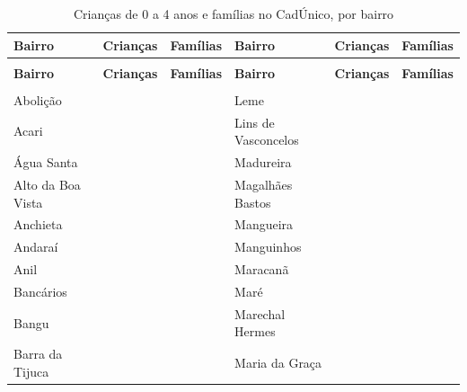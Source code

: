 \begin{apendicesenv}
{\renewcommand{\arraystretch}{1.0}
{\footnotesize\setlength{\tabcolsep}{3.5pt}
\begin{longtable}{@{}>{\raggedright\arraybackslash}p{2.95cm}>{\raggedleft\arraybackslash}p{2.00cm}>{\raggedleft\arraybackslash}p{2.00cm}@{\hspace{0.6cm}}>{\raggedright\arraybackslash}p{2.95cm}>{\raggedleft\arraybackslash}p{2.00cm}>{\raggedleft\arraybackslash}p{2.00cm}@{}}
\caption{Crianças de 0 a 4 anos e famílias no CadÚnico, por bairro}\label{tab:cadunico-por-bairro-ate-4-2026}\\
\toprule \hyphenpenalty=10000\exhyphenpenalty=10000\textbf{Bairro} & \hyphenpenalty=10000\exhyphenpenalty=10000\textbf{Crianças} & \hyphenpenalty=10000\exhyphenpenalty=10000\textbf{Famílias} & \hyphenpenalty=10000\exhyphenpenalty=10000\textbf{Bairro} & \hyphenpenalty=10000\exhyphenpenalty=10000\textbf{Crianças} & \hyphenpenalty=10000\exhyphenpenalty=10000\textbf{Famílias} \\ \midrule \endfirsthead
\multicolumn{6}{@{}l}{\footnotesize\itshape (continuação)}\\ \toprule \hyphenpenalty=10000\exhyphenpenalty=10000\textbf{Bairro} & \hyphenpenalty=10000\exhyphenpenalty=10000\textbf{Crianças} & \hyphenpenalty=10000\exhyphenpenalty=10000\textbf{Famílias} & \hyphenpenalty=10000\exhyphenpenalty=10000\textbf{Bairro} & \hyphenpenalty=10000\exhyphenpenalty=10000\textbf{Crianças} & \hyphenpenalty=10000\exhyphenpenalty=10000\textbf{Famílias} \\ \midrule \endhead
\midrule \multicolumn{6}{r@{}}{\footnotesize\itshape (continua)}\\ \endfoot
\bottomrule \endlastfoot
Abolição & 131 & 122 & Leme & 136 & 126 \\
Acari & 1.324 & 1.205 & Lins de Vasconcelos & 774 & 710 \\
Água Santa & 127 & 118 & Madureira & 1.177 & 1.082 \\
Alto da Boa Vista & 151 & 130 & Magalhães Bastos & 452 & 416 \\
Anchieta & 1.856 & 1.677 & Mangueira & 676 & 624 \\
Andaraí & 365 & 339 & Manguinhos & 1.573 & 1.427 \\
Anil & 2.643 & 2.441 & Maracanã & 44 & 41 \\
Bancários & 379 & 337 & Maré & 2.818 & 2.574 \\
Bangu & 6.236 & 5.757 & Marechal Hermes & 859 & 792 \\
Barra da Tijuca & 286 & 267 & Maria da Graça & 64 & 60 \\

\end{longtable}}}
\end{apendicesenv}
